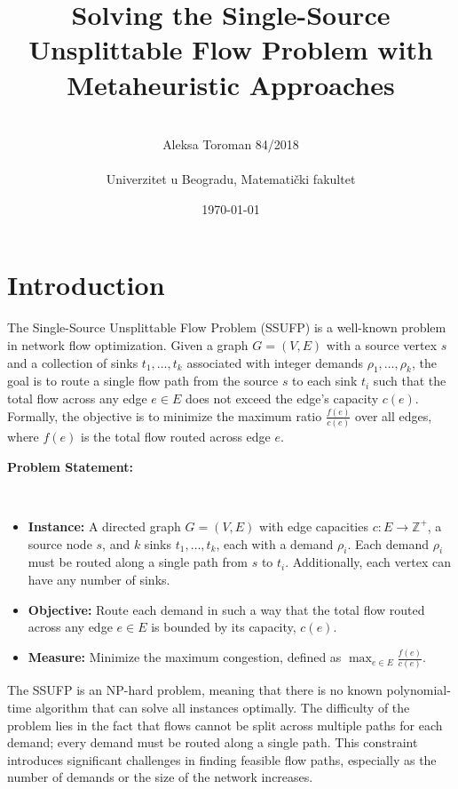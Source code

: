 \documentclass[a4paper,12pt]{article}
\title{Solving the Single-Source Unsplittable Flow Problem with Metaheuristic Approaches}
\author{\\Aleksa Toroman 84/2018 \\\\ Univerzitet u Beogradu, Matematički fakultet}
\date{\today}
\begin{document}
\maketitle

\newpage
\renewcommand{\contentsname}{Table of contents}
\tableofcontents

\newpage

\section{Introduction}

The Single-Source Unsplittable Flow Problem (SSUFP) is a well-known problem in network flow optimization. Given a graph $G = (V, E)$ with a source vertex $s$ and a collection of sinks $t_1, \ldots, t_k$ associated with integer demands $\rho_1, \ldots, \rho_k$, the goal is to route a single flow path from the source $s$ to each sink $t_i$ such that the total flow across any edge $e \in E$ does not exceed the edge’s capacity $c(e)$. Formally, the objective is to minimize the maximum ratio $\frac{f(e)}{c(e)}$ over all edges, where $f(e)$ is the total flow routed across edge $e$.

\noindent \textbf{Problem Statement:}

\

\begin{itemize}
    \item \textbf{Instance:} A directed graph $G=(V, E)$ with edge capacities $c: E \to \mathbb{Z}^+$, a source node $s$, and $k$ sinks $t_1, \ldots, t_k$, each with a demand $\rho_i$. Each demand $\rho_i$ must be routed along a single path from $s$ to $t_i$. Additionally, each vertex can have any number of sinks.
    \item \textbf{Objective:} Route each demand in such a way that the total flow routed across any edge $e \in E$ is bounded by its capacity, $c(e)$.
    \item \textbf{Measure:} Minimize the maximum congestion, defined as $\max_{e \in E} \frac{f(e)}{c(e)}$.
\end{itemize}

\noindent The SSUFP is an NP-hard problem, meaning that there is no known polynomial-time algorithm that can solve all instances optimally. The difficulty of the problem lies in the fact that flows cannot be split across multiple paths for each demand; every demand must be routed along a single path. This constraint introduces significant challenges in finding feasible flow paths, especially as the number of demands or the size of the network increases. \\
\end{document}
